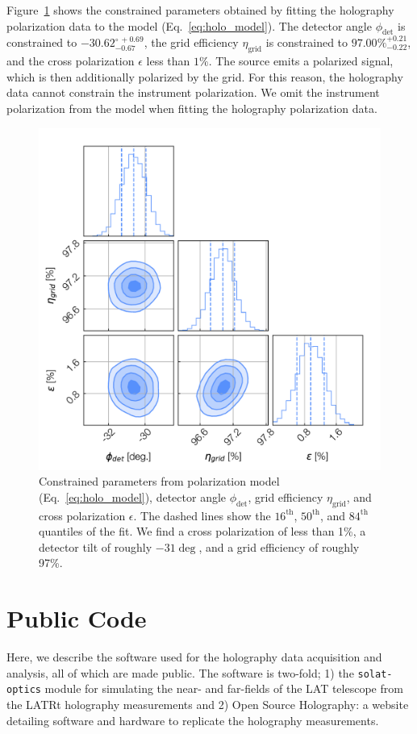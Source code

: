 Figure~\ref{fig:holo_crosspol_params} shows the constrained parameters obtained by fitting the holography polarization data to the model (Eq.~\ref{eq:holo_model}).  The detector angle $\phi_{\text{det}}$ is constrained to $-30.62^{\circ\,+0.69}_{-0.67}$, the grid efficiency $\eta_{\text{grid}}$ is constrained to $97.00\%^{+0.21}_{-0.22}$, and the cross polarization $\epsilon$ less than $1\%$.  The source emits a polarized signal, which is then additionally polarized by the grid.  For this reason, the holography data cannot constrain the instrument polarization.  We omit the instrument polarization from the model when fitting the holography polarization data. 

\begin{figure}[ht]
    \centering
    \includegraphics[height = .8\textwidth]{Figures/pol_params.pdf}
    \caption{Constrained parameters from polarization model (Eq.~\ref{eq:holo_model}), detector angle $\phi_{\text{det}}$, grid efficiency $\eta_{\text{grid}}$, and cross polarization $\epsilon$.  The dashed lines show the $16^{\text{th}}$, $50^{\text{th}}$, and $84^{\text{th}}$ quantiles of the fit.  We find a cross polarization of less than 1\%, a detector tilt of roughly $-31\deg$, and a grid efficiency of roughly 97\%.  }
    \label{fig:holo_crosspol_params}
\end{figure}

\section{Public Code}
\label{sec:solat_code}
Here, we describe the software used for the holography data acquisition and analysis, all of which are made public.  The software is two-fold; 1) the \verb|solat-optics| module for simulating the near- and far-fields of the LAT telescope from the LATRt holography measurements and 2) Open Source Holography: a website detailing software and hardware to replicate the holography measurements.

